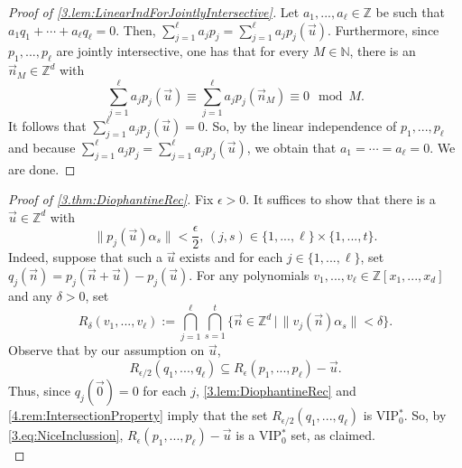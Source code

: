 \documentclass[11pt,american,preprint]{elsarticle}
\numberwithin{equation}{section}
\theoremstyle{plain}
\theoremstyle{plain*}
\theoremstyle{plain}
\theoremstyle{plain*}
\theoremstyle{plain}
\theoremstyle{plain*}
\theoremstyle{remark}
\theoremstyle{remark*}
\theoremstyle{remark}
\theoremstyle{remark*}
\theoremstyle{remark}
\theoremstyle{remark*}
\theoremstyle{plain}
\theoremstyle{definition}
\theoremstyle{plain}
\theoremstyle{plain} %
\newcommand{\N}{\mathbb{N}}
\newcommand{\Z}{\mathbb{Z}}
\begin{document}
\begin{proof}[Proof of \cref{3.lem:LinearIndForJointlyIntersective}]
    Let $a_1,...,a_\ell\in\Z$ be such that $a_1q_1+\cdots+a_\ell q_\ell=0$. Then, $\sum_{j=1}^\ell a_j p_j=\sum_{j=1}^\ell a_jp_j(\vec  u)$. Furthermore, since $p_1,...,p_\ell$ are jointly intersective, one has that for every $M\in\N$, there is an $\vec n_M\in\Z^d$ with 
    $$\sum_{j=1}^\ell a_jp_j({\vec u})\equiv \sum_{j=1}^\ell a_jp_j(\vec n_M)\equiv 0\mod M.$$
    It follows that $\sum_{j=1}^\ell a_jp_j({\vec u})=0$. So, by the linear independence of $p_1,...,p_\ell$ and because $\sum_{j=1}^\ell a_jp_j=\sum_{j=1}^\ell a_jp_j({\vec u})$, we obtain that $a_1=\cdots=a_\ell=0$. We are done.
\end{proof}
\begin{proof}[Proof of \cref{3.thm:DiophantineRec}]
 Fix $\epsilon>0$. It suffices to show that there is a ${\vec u}\in\Z^d$ with 
\begin{equation}\label{3.eq:SingleGoodTime}
\|p_j({\vec u})\alpha_s\|<\frac{\epsilon}{2},\,(j,s)\in \{1,...,\ell\}\times\{1,...,t\}.
\end{equation}
Indeed, suppose that such a ${\vec u}$ exists and for each $j\in\{1,...,\ell\}$, set $q_j(\vec n)=p_j(\vec n+\vec u)-p_j(\vec u)$. For any polynomials $v_1,...,v_\ell\in \Z[x_1,...,x_d]$ and any $\delta>0$, set 
$$
R_\delta(v_1,...,v_\ell):=\bigcap_{j=1}^\ell\bigcap_{s=1}^t\{\vec n\in\Z^d\,|\,\|v_j(\vec n)\alpha_s\|<\delta\}.
$$
Observe that by our assumption on $\vec u$,
\begin{equation}\label{3.eq:NiceInclussion}
R_{\epsilon/2}(q_1,...,q_\ell)\subseteq R_\epsilon(p_1,...,p_\ell)-{\vec u}.
\end{equation}
Thus, since  $q_j(\vec 0)=0$ for each $j$, \cref{3.lem:DiophantineRec} and  \cref{4.rem:IntersectionProperty} imply that the set 
$R_{\epsilon/2}(q_1,...,q_\ell)$ is VIP$_0^*$. So, by \eqref{3.eq:NiceInclussion}, $R_\epsilon(p_1,...,p_\ell)-{\vec u}$ is a VIP$_0^*$ set, as claimed.\\


\end{proof}
\end{document}

